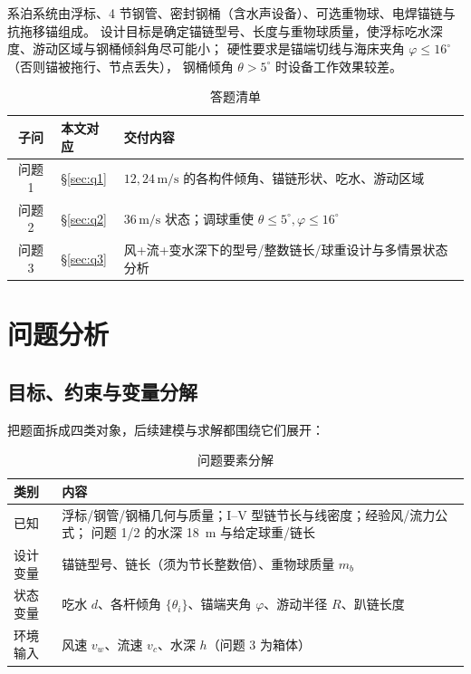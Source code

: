 \documentclass[UTF8,a4paper,zihao=-4]{ctexart}
\begin{document}
系泊系统由浮标、4 节钢管、密封钢桶（含水声设备）、可选重物球、电焊锚链与抗拖移锚组成。
设计目标是确定锚链型号、长度与重物球质量，使浮标吃水深度、游动区域与钢桶倾斜角尽可能小；
硬性要求是锚端切线与海床夹角 \(\varphi\le16^\circ\)（否则锚被拖行、节点丢失），
钢桶倾角 \(\theta>5^\circ\) 时设备工作效果较差。

\begin{table}[H]
\centering
\caption{答题清单}
\begin{tabular}{clp{8.6cm}}
\toprule
子问 & 本文对应 & 交付内容 \\
\midrule
问题 1 & \S\ref{sec:q1} & \(12,24\,\mathrm{m/s}\) 的各构件倾角、锚链形状、吃水、游动区域 \\
问题 2 & \S\ref{sec:q2} & \(36\,\mathrm{m/s}\) 状态；调球重使 \(\theta\le 5^\circ,\varphi\le 16^\circ\) \\
问题 3 & \S\ref{sec:q3} & 风+流+变水深下的型号/整数链长/球重设计与多情景状态分析 \\
\bottomrule
\end{tabular}
\end{table}

\section{问题分析}

\subsection{目标、约束与变量分解}

把题面拆成四类对象，后续建模与求解都围绕它们展开：

\begin{table}[H]
\centering
\caption{问题要素分解}
\begin{tabular}{lp{11.2cm}}
\toprule
类别 & 内容 \\
\midrule
已知 & 浮标/钢管/钢桶几何与质量；I--V 型链节长与线密度；经验风/流力公式；
问题 1/2 的水深 \SI{18}{m} 与给定球重/链长 \\
设计变量 & 锚链型号、链长（须为节长整数倍）、重物球质量 \(m_b\) \\
状态变量 & 吃水 \(d\)、各杆倾角 \(\{\theta_i\}\)、锚端夹角 \(\varphi\)、游动半径 \(R\)、趴链长度 \\
环境输入 & 风速 \(v_w\)、流速 \(v_c\)、水深 \(h\)（问题 3 为箱体） \\
\bottomrule
\end{tabular}
\end{table}
\end{document}
